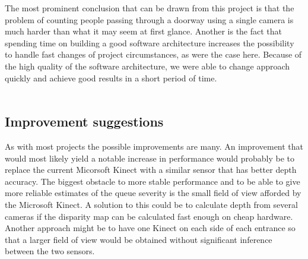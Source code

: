 The most prominent conclusion that can be drawn from this project is that the problem of counting people passing through a doorway using a single camera is much harder than what it may seem at first glance. Another is the fact that spending time on building a good software architecture increases the possibility to handle fast changes of project circumstances, as were the case here. Because of the high quality of the software architecture, we were able to change approach quickly and achieve good results in a short period of time.\\
\\


\subsection{Improvement suggestions}
As with most projects the possible improvements are many. An improvement that would most likely yield a notable increase in performance would probably be to replace the current Micorsoft Kinect with a similar sensor that has better depth accuracy. The biggest obstacle to more stable performance and to be able to give more reliable estimates of the queue severity is the small field of view afforded by the Microsoft Kinect. A solution to this could be to calculate depth from several cameras if the disparity map can be calculated fast enough on cheap hardware. Another approach might be to have one Kinect on each side of each entrance so that a larger field of view would be obtained without significant inference between the two sensors.\\
\\
















